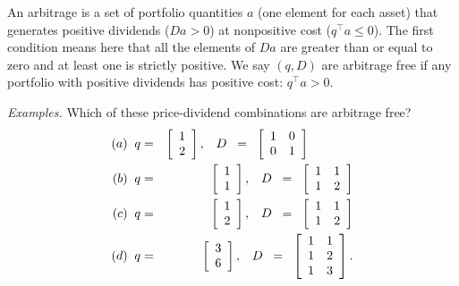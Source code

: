 \documentclass[11pt]{article}
\begin{document}
An arbitrage is a set of portfolio quantities $a$ (one element for each asset)
that generates positive dividends ($D a > 0$)
at nonpositive cost ($q^\top a \leq 0$).
The first condition means here that all the elements
of $Da$ are greater than or equal to zero and at least one is strictly
positive.
We say $(q,D)$ are arbitrage free if
any portfolio with positive dividends has positive cost:
$q^\top a > 0$.

{\it Examples.\/}
Which of these price-dividend combinations are arbitrage free?
\begin{eqnarray*}
  (a) \;\;  q &=& \left[
            \begin{array}{c}
             1 \\ 2
            \end{array}
          \right], \;\;\;
        D \;\;=\;\;
            \left[
            \begin{array}{cc}
             1 & 0 \\ 0 & 1
            \end{array}
          \right]    \hspace*{0.5in}  \\
  (b) \;\;  q &=& \left[
            \begin{array}{c}
             1 \\ 1
            \end{array}
          \right], \;\;\;
        D \;\;=\;\;
            \left[
            \begin{array}{cc}
             1 & 1 \\ 1 & 2
            \end{array}
          \right]      \\
  (c) \;\;    q &=& \left[
            \begin{array}{c}
             1 \\ 2
            \end{array}
          \right], \;\;\;
        D \;\;=\;\;
            \left[
            \begin{array}{cc}
             1 & 1 \\ 1 & 2
            \end{array}
          \right]      \\
  (d) \;\;    q &=& \left[
            \begin{array}{c}
             3 \\ 6
            \end{array}
          \right], \;\;\;
        D \;\;=\;\;
            \left[
            \begin{array}{cc}
             1 & 1 \\ 1 & 2 \\ 1 & 3
            \end{array}
          \right]    .
\end{eqnarray*}
\end{document}
